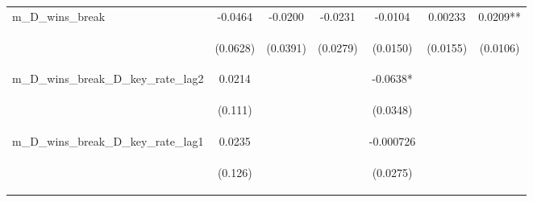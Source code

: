 \documentclass[]{article}
\begin{document}
\begin{center}
\begin{tabular}{lcccccc}
m\_D\_wins\_break & -0.0464 & -0.0200 & -0.0231 & -0.0104 & 0.00233 & 0.0209** \\
\vspace{4pt} & \begin{footnotesize}(0.0628)\end{footnotesize} & \begin{footnotesize}(0.0391)\end{footnotesize} & \begin{footnotesize}(0.0279)\end{footnotesize} & \begin{footnotesize}(0.0150)\end{footnotesize} & \begin{footnotesize}(0.0155)\end{footnotesize} & \begin{footnotesize}(0.0106)\end{footnotesize} \\
m\_D\_wins\_break\_D\_key\_rate\_lag2 & 0.0214 &  &  & -0.0638* &  &  \\
\vspace{4pt} & \begin{footnotesize}(0.111)\end{footnotesize} & \begin{footnotesize}\end{footnotesize} & \begin{footnotesize}\end{footnotesize} & \begin{footnotesize}(0.0348)\end{footnotesize} & \begin{footnotesize}\end{footnotesize} & \begin{footnotesize}\end{footnotesize} \\
m\_D\_wins\_break\_D\_key\_rate\_lag1 & 0.0235 &  &  & -0.000726 &  &  \\
\vspace{4pt} & \begin{footnotesize}(0.126)\end{footnotesize} & \begin{footnotesize}\end{footnotesize} & \begin{footnotesize}\end{footnotesize} & \begin{footnotesize}(0.0275)\end{footnotesize} & \begin{footnotesize}\end{footnotesize} & \begin{footnotesize}\end{footnotesize} \\

\end{tabular}
\end{center}
\end{document}
